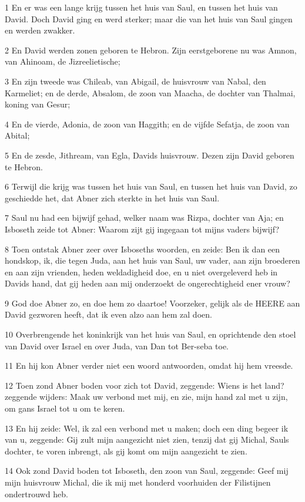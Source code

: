 \par 1 En er was een lange krijg tussen het huis van Saul, en tussen het huis van David. Doch David ging en werd sterker; maar die van het huis van Saul gingen en werden zwakker.
\par 2 En David werden zonen geboren te Hebron. Zijn eerstgeborene nu was Amnon, van Ahinoam, de Jizreelietische;
\par 3 En zijn tweede was Chileab, van Abigail, de huisvrouw van Nabal, den Karmeliet; en de derde, Absalom, de zoon van Maacha, de dochter van Thalmai, koning van Gesur;
\par 4 En de vierde, Adonia, de zoon van Haggith; en de vijfde Sefatja, de zoon van Abital;
\par 5 En de zesde, Jithream, van Egla, Davids huisvrouw. Dezen zijn David geboren te Hebron.
\par 6 Terwijl die krijg was tussen het huis van Saul, en tussen het huis van David, zo geschiedde het, dat Abner zich sterkte in het huis van Saul.
\par 7 Saul nu had een bijwijf gehad, welker naam was Rizpa, dochter van Aja; en Isboseth zeide tot Abner: Waarom zijt gij ingegaan tot mijns vaders bijwijf?
\par 8 Toen ontstak Abner zeer over Isboseths woorden, en zeide: Ben ik dan een hondskop, ik, die tegen Juda, aan het huis van Saul, uw vader, aan zijn broederen en aan zijn vrienden, heden weldadigheid doe, en u niet overgeleverd heb in Davids hand, dat gij heden aan mij onderzoekt de ongerechtigheid ener vrouw?
\par 9 God doe Abner zo, en doe hem zo daartoe! Voorzeker, gelijk als de HEERE aan David gezworen heeft, dat ik even alzo aan hem zal doen.
\par 10 Overbrengende het koninkrijk van het huis van Saul, en oprichtende den stoel van David over Israel en over Juda, van Dan tot Ber-seba toe.
\par 11 En hij kon Abner verder niet een woord antwoorden, omdat hij hem vreesde.
\par 12 Toen zond Abner boden voor zich tot David, zeggende: Wiens is het land? zeggende wijders: Maak uw verbond met mij, en zie, mijn hand zal met u zijn, om gans Israel tot u om te keren.
\par 13 En hij zeide: Wel, ik zal een verbond met u maken; doch een ding begeer ik van u, zeggende: Gij zult mijn aangezicht niet zien, tenzij dat gij Michal, Sauls dochter, te voren inbrengt, als gij komt om mijn aangezicht te zien.
\par 14 Ook zond David boden tot Isboseth, den zoon van Saul, zeggende: Geef mij mijn huisvrouw Michal, die ik mij met honderd voorhuiden der Filistijnen ondertrouwd heb.
